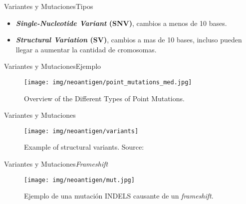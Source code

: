 \documentclass[10pt]{beamer}
\newcommand{\1}{
	\setbeamertemplate{background}{
		\texttt{[image: img/1]}
		\tikz[overlay] \fill[fill opacity=0.75,fill=white] (0,0) rectangle (-\paperwidth,\paperheight);
	}
}
\begin{document}
\begin{frame}{Variantes y Mutaciones}{Tipos}
	\begin{block}{}
		\begin{itemize}
			\item \textbf{\textit{Single-Nucleotide Variant} (SNV)}, cambios a menos de 10 bases.
			\item \textbf{\textit{Structural Variation} (SV)}, cambios a mas de 10 bases, incluso pueden llegar a aumentar la cantidad de cromosomas.
		\end{itemize}	
	\end{block}
\end{frame}

\begin{frame}{Variantes y Mutaciones}{Ejemplo}
	\begin{figure}[]
		\centering
		\texttt{[image: img/neoantigen/point\_mutations\_med.jpg]}
		\label{img:alig}
		\caption{Overview of the Different Types of Point Mutations.}
	\end{figure}
\end{frame}

\begin{frame}{Variantes y Mutaciones}{}
	\begin{figure}[h]
		\centering
		\texttt{[image: img/neoantigen/variants]}
		\caption{Example of structural variants. Source: \cite{sv_pacbio_2021}}
		\label{fig:variants}
	\end{figure}	
\end{frame}

\begin{frame}{Variantes y Mutaciones}{\textit{Frameshift}}
	\begin{figure}[]
		\centering
		\texttt{[image: img/neoantigen/mut.jpg]}
		\caption{Ejemplo de una mutación INDELS causante de un \textit{frameshift}.}
	\end{figure}
\end{frame}
\end{document}
